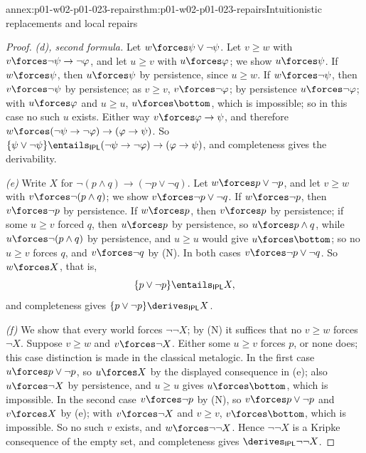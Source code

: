 \begin{annexitem}{annex:p01-w02-p01-023-repairs}{thm:p01-w02-p01-023-repairs}{Intuitionistic replacements and local repairs}
\begin{proof}
\emph{(d), second formula.} Let \(w\forces\psi\lor\neg\psi\). Let
\(v\geq w\) with \(v\forces\neg\psi\to\neg\varphi\), and let \(u\geq v\)
with \(u\forces\varphi\); we show \(u\forces\psi\). If \(w\forces\psi\),
then \(u\forces\psi\) by persistence, since \(u\geq w\). If
\(w\forces\neg\psi\), then \(v\forces\neg\psi\) by persistence; as
\(v\geq v\), \(v\forces\neg\varphi\); by persistence
\(u\forces\neg\varphi\); with \(u\forces\varphi\) and \(u\geq u\),
\(u\forces\bottom\), which is impossible; so in this case no such \(u\)
exists. Either way \(v\forces\varphi\to\psi\), and therefore
\(w\forces(\neg\psi\to\neg\varphi)\to(\varphi\to\psi)\). So
\(\{\psi\lor\neg\psi\}\entails_{\mathsf{IPL}}(\neg\psi\to\neg\varphi)\to(\varphi\to\psi)\),
and completeness gives the derivability.

\emph{(e)} Write \(X\) for \(\neg(p\land q)\to(\neg p\lor\neg q)\). Let
\(w\forces p\lor\neg p\), and let \(v\geq w\) with
\(v\forces\neg(p\land q)\); we show \(v\forces\neg p\lor\neg q\). If
\(w\forces\neg p\), then \(v\forces\neg p\) by persistence. If
\(w\forces p\), then \(v\forces p\) by persistence; if some \(u\geq v\)
forced \(q\), then \(u\forces p\) by persistence, so \(u\forces p\land q\),
while \(u\forces\neg(p\land q)\) by persistence, and \(u\geq u\) would give
\(u\forces\bottom\); so no \(u\geq v\) forces \(q\), and
\(v\forces\neg q\) by (N). In both cases \(v\forces\neg p\lor\neg q\). So
\(w\forces X\), that is,
\begin{equation*}
  \{p\lor\neg p\}\entails_{\mathsf{IPL}}X,
\end{equation*}
and completeness gives \(\{p\lor\neg p\}\derives_{\mathsf{IPL}}X\).

\emph{(f)} We show that every world forces \(\neg\neg X\); by (N) it
suffices that no \(v\geq w\) forces \(\neg X\). Suppose
\(v\geq w\) and \(v\forces\neg X\). Either some \(u\geq v\) forces \(p\),
or none does; this case distinction is made in the classical metalogic.
In the first case \(u\forces p\lor\neg p\), so \(u\forces X\) by the
displayed consequence in (e); also \(u\forces\neg X\) by persistence, and
\(u\geq u\) gives \(u\forces\bottom\), which is impossible. In the second
case \(v\forces\neg p\) by (N), so \(v\forces p\lor\neg p\) and
\(v\forces X\) by (e); with \(v\forces\neg X\) and \(v\geq v\),
\(v\forces\bottom\), which is impossible. So no such \(v\) exists, and
\(w\forces\neg\neg X\). Hence \(\neg\neg X\) is a Kripke consequence of the
empty set, and completeness gives \(\derives_{\mathsf{IPL}}\neg\neg X\).
\end{proof}
\end{annexitem}
